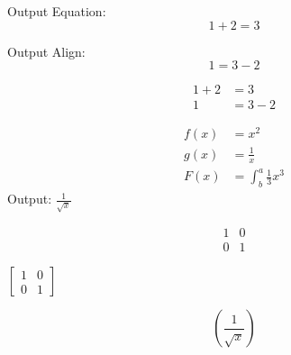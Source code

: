 \documentclass{article}
\begin{document}
Output Equation:
\begin{equation*}
1 + 2 = 3
\end{equation*}

Output Align:
\begin{equation*}
1 = 3 - 2
\end{equation*}
  
\begin{align*}
    1 + 2 &= 3 \\
    1 &= 3 - 2
\end{align*}

\begin{align*}
    f(x) &= x^2 \\
    g(x) &= \frac{1}{x} \\
    F(x) &= \int^a_b \frac{1}{3}x^3
\end{align*}
Output: $\frac{1}{\sqrt{x}}$

\begin{equation*}
    \begin{matrix}
        1 & 0 \\
        0 & 1
    \end{matrix}
\end{equation*}

$
\left[
    \begin{matrix}
        1 & 0 \\
        0 & 1
    \end{matrix}
\right]
$

\begin{equation*}
    \left(\frac{1}{\sqrt{x}}\right)
\end{equation*}
\end{document}
